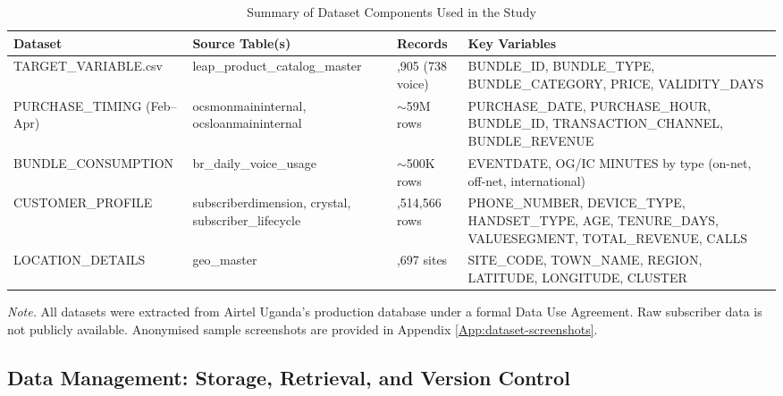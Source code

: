 \begin{table}[H]
\centering
\caption{Summary of Dataset Components Used in the Study}
\label{tab:datasets}
\small
\renewcommand{\arraystretch}{1.3}
\setlength{\tabcolsep}{4pt}
\begin{tabularx}{\textwidth}{
  >{\raggedright\arraybackslash}p{5.0cm}
  >{\raggedright\arraybackslash}p{3.8cm}
  >{\raggedright\arraybackslash}p{1.6cm}
  >{\raggedright\arraybackslash}X
}
\toprule
\textbf{Dataset} & \textbf{Source Table(s)} & \textbf{Records} & \textbf{Key Variables} \\
\midrule
TARGET\_VARIABLE.csv &
leap\_product\_\allowbreak catalog\_\allowbreak master &
1,905 (738 voice) &
BUNDLE\_ID, BUNDLE\_TYPE, BUNDLE\_CATEGORY, PRICE, VALIDITY\_DAYS \\
\addlinespace[4pt]
PURCHASE\_TIMING (Feb--Apr) &
ocsmonmaininternal, ocsloanmaininternal &
$\sim$59M rows &
PURCHASE\_DATE, PURCHASE\_HOUR, BUNDLE\_ID, TRANSACTION\_CHANNEL, BUNDLE\_REVENUE \\
\addlinespace[4pt]
BUNDLE\_CONSUMPTION &
br\_daily\_voice\_usage &
$\sim$500K rows &
EVENTDATE, OG/IC MINUTES by type (on-net, off-net, international) \\
\addlinespace[4pt]
CUSTOMER\_PROFILE &
subscriberdimension, crystal, subscriber\_lifecycle &
1,514,566 rows &
PHONE\_NUMBER, DEVICE\_TYPE, HANDSET\_TYPE, AGE, TENURE\_DAYS, VALUESEGMENT, TOTAL\_REVENUE, CALLS \\
\addlinespace[4pt]
LOCATION\_DETAILS &
geo\_master &
3,697 sites &
SITE\_CODE, TOWN\_NAME, REGION, LATITUDE, LONGITUDE, CLUSTER \\
\bottomrule
\end{tabularx}
\begin{flushleft}
\small\textit{Note.} All datasets were extracted from Airtel Uganda's production database under a formal Data Use Agreement. Raw subscriber data is not publicly available. Anonymised sample screenshots are provided in Appendix \ref{App:dataset-screenshots}.
\end{flushleft}
\end{table}

\subsection{Data Management: Storage, Retrieval, and Version Control}

